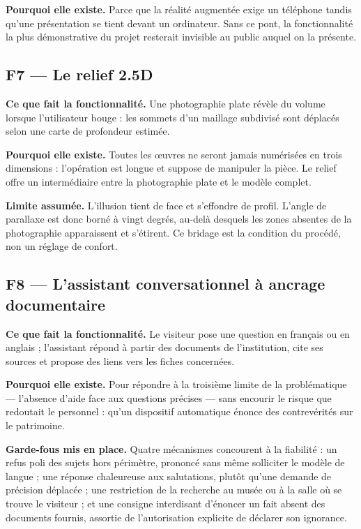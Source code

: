 \textbf{Pourquoi elle existe.} Parce que la réalité augmentée exige un téléphone
tandis qu'une présentation se tient devant un ordinateur. Sans ce pont, la
fonctionnalité la plus démonstrative du projet resterait invisible au public
auquel on la présente.

\subsection{F7 — Le relief 2.5D}

\textbf{Ce que fait la fonctionnalité.} Une photographie plate révèle du volume
lorsque l'utilisateur bouge : les sommets d'un maillage subdivisé sont déplacés
selon une carte de profondeur estimée.

\textbf{Pourquoi elle existe.} Toutes les œuvres ne seront jamais numérisées en
trois dimensions : l'opération est longue et suppose de manipuler la pièce. Le
relief offre un intermédiaire entre la photographie plate et le modèle complet.

\textbf{Limite assumée.} L'illusion tient de face et s'effondre de profil.
L'angle de parallaxe est donc borné à vingt degrés, au-delà desquels les zones
absentes de la photographie apparaissent et s'étirent. Ce bridage est la
condition du procédé, non un réglage de confort.

\subsection{F8 — L'assistant conversationnel à ancrage documentaire}

\textbf{Ce que fait la fonctionnalité.} Le visiteur pose une question en
français ou en anglais ; l'assistant répond à partir des documents de
l'institution, cite ses sources et propose des liens vers les fiches concernées.

\textbf{Pourquoi elle existe.} Pour répondre à la troisième limite de la
problématique — l'absence d'aide face aux questions précises — sans encourir le
risque que redoutait le personnel : qu'un dispositif automatique énonce des
contrevérités sur le patrimoine.

\textbf{Garde-fous mis en place.} Quatre mécanismes concourent à la fiabilité :
un refus poli des sujets hors périmètre, prononcé sans même solliciter le modèle
de langue ; une réponse chaleureuse aux salutations, plutôt qu'une demande de
précision déplacée ; une restriction de la recherche au musée ou à la salle où
se trouve le visiteur ; et une consigne interdisant d'énoncer un fait absent des
documents fournis, assortie de l'autorisation explicite de déclarer son
ignorance.

